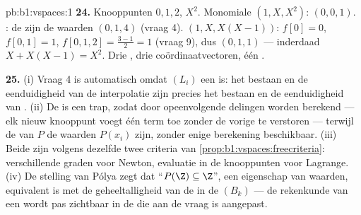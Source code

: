 \begin{solution}{pb:b1:vspaces:1}
\textbf{24.} Knooppunten $0, 1, 2$,  $X^2$. Monomiale 
$(1, X, X^2)$:  $(0, 0, 1)$. : de
 zijn de waarden $(0, 1, 4)$ (vraag 4). 
$(1, X, X(X-1))$:  $f[0] = 0$, $f[0,1] = 1$,
$f[0,1,2] = \frac{3 - 1}{2} = 1$ (vraag 9), dus  $(0, 1,
1)$ --- inderdaad $X + X(X-1) = X^2$. Drie , drie
coördinaatvectoren, één .

\textbf{25.} (i) Vraag 4 is automatisch omdat $(L_i)$ een
\emph{} is: het bestaan en de eenduidigheid van de
interpolatie zijn precies het bestaan en de eenduidigheid van
. (ii) De  is een trap, zodat 
door opeenvolgende delingen worden berekend --- elk nieuw knooppunt
voegt één term toe zonder de vorige te verstoren --- terwijl de
 van $P$ de waarden $P(x_i)$ zijn, zonder enige
berekening beschikbaar. (iii) Beide  zijn  volgens
dezelfde twee criteria van \cref{prop:b1:vspaces:freecriteria}:
verschillende graden voor Newton, evaluatie in de knooppunten voor
Lagrange. (iv) De stelling van Pólya zegt dat ``$P(\Z) \subseteq
\Z$'', een eigenschap van waarden, equivalent is met de
geheeltalligheid van de  in de  $(B_k)$ --- de
rekenkunde van een  wordt pas zichtbaar in de  die aan
de vraag is aangepast.
\end{solution}
